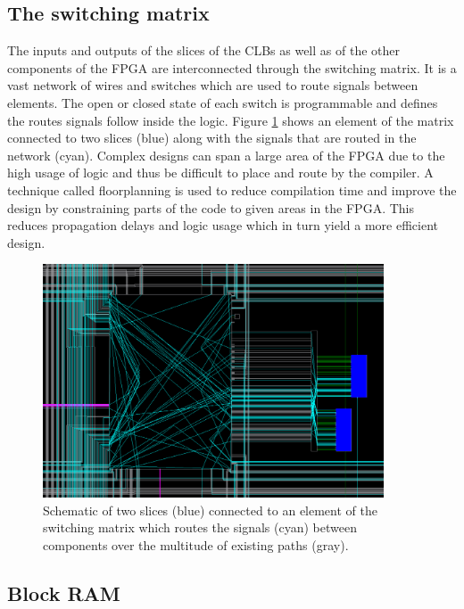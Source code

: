    \subsection{The switching matrix}

      The inputs and outputs of the slices of the CLBs as well as of the other components of the FPGA are interconnected through the switching matrix. It is a vast network of wires and switches which are used to route signals between elements. The open or closed state of each switch is programmable and defines the routes signals follow inside the logic. Figure \ref{fig:II-5-switch} shows an element of the matrix connected to two slices (blue) along with the signals that are routed in the network (cyan). Complex designs can span a large area of the FPGA due to the high usage of logic and thus be difficult to place and route by the compiler. A technique called floorplanning is used to reduce compilation time and improve the design by constraining parts of the code to given areas in the FPGA. This reduces propagation delays and logic usage which in turn yield a more efficient design.

      \begin{figure}[h!]
        \centering
        \includegraphics[width=0.9\textwidth]{img/II-5-irradiation/switch.png}
        \caption{Schematic of two slices (blue) connected to an element of the switching matrix which routes the signals (cyan) between components over the multitude of existing paths (gray).}
        \label{fig:II-5-switch}
      \end{figure}

    \subsection{Block RAM}

